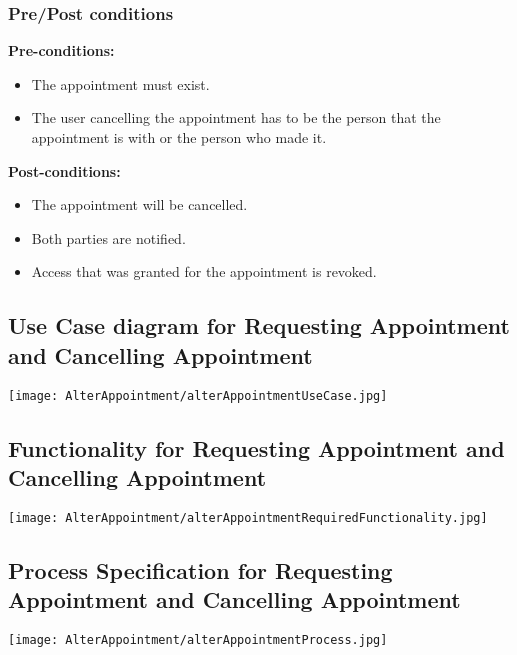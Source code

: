\subsubsection{Pre/Post conditions}
\textbf{Pre-conditions:} 
	\begin{itemize}
		\item The appointment must exist.
		\item The user cancelling the appointment has to be the person that the appointment is with or the person who made it.
	\end{itemize}
\textbf{Post-conditions:} 
	\begin{itemize}
		\item The appointment will be cancelled.
		\item  Both parties are notified.
		\item Access that was granted for the appointment is revoked. 
	\end{itemize}

\subsection{Use Case diagram for Requesting Appointment and Cancelling Appointment}
	\texttt{[image: AlterAppointment/alterAppointmentUseCase.jpg]}
\subsection{Functionality for Requesting Appointment and Cancelling Appointment}
	\texttt{[image: AlterAppointment/alterAppointmentRequiredFunctionality.jpg]}
\subsection{Process Specification for Requesting Appointment and Cancelling Appointment}
	\texttt{[image: AlterAppointment/alterAppointmentProcess.jpg]}

